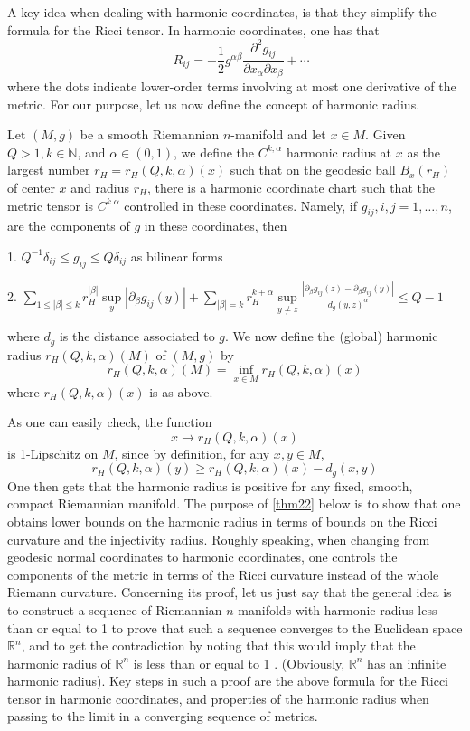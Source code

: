 \documentclass[12pt,hyperref,a4paper,UTF8]{ctexart}
\begin{document}
A key idea when dealing with harmonic coordinates, is that they simplify the formula for the Ricci tensor. In harmonic coordinates, one has that
$$
\quad R_{i j}=-\frac{1}{2} g^{\alpha \beta} \frac{\partial^2 g_{i j}}{\partial x_\alpha \partial x_\beta}+\cdots
$$
where the dots indicate lower-order terms involving at most one derivative of the metric. 
For our purpose, let us now define the concept of harmonic radius.
\begin{Definition}
Let $(M, g)$ be a smooth Riemannian $n$-manifold and let $x \in M$. Given $Q>1, k \in \mathbb{N}$, and $\alpha \in(0,1)$, we define the $C^{k, \alpha}$ harmonic radius at $x$ as the largest number $r_H=r_H(Q, k, \alpha)(x)$ such that on the geodesic ball $B_x\left(r_H\right)$ of center $x$ and radius $r_H$, there is a harmonic coordinate chart such that the metric tensor is $C^{k . \alpha}$ controlled in these coordinates. Namely, if $g_{i j}, i, j=1, \ldots, n$, are the components of $g$ in these coordinates, then

\vskip 3pt
1. $Q^{-1} \delta_{i j} \leq g_{i j} \leq Q \delta_{i j}$ as bilinear forms

\vskip 3pt
2. $\sum\limits_{1 \leq|\beta| \leq k} r_H^{|\beta|} \sup\limits_{y}\left|\partial_\beta g_{i j}(y)\right|+\sum\limits_{|\beta|=k} r_H^{k+\alpha} \sup\limits_{y \neq z} \frac{\left|\partial_\beta g_{i j}(z)-\partial_\beta g_{i j}(y)\right|}{d_g(y, z)^\alpha} \leq Q-1$

\vskip 3pt
\noindent
where $d_g$ is the distance associated to $g$. We now define the (global) harmonic radius $r_H(Q, k, \alpha)(M)$ of $(M, g)$ by
$$
r_H(Q, k, \alpha)(M)=\inf _{x \in M} r_H(Q, k, \alpha)(x)
$$
where $r_H(Q, k, \alpha)(x)$ is as above.
\label{def21}
\end{Definition}
As one can easily check, the function
$$
x \rightarrow r_H(Q, k, \alpha)(x)
$$
is 1-Lipschitz on $M$, since by definition, for any $x, y \in M$,
$$
r_H(Q, k, \alpha)(y) \geq r_H(Q, k, \alpha)(x)-d_g(x, y)
$$
One then gets that the harmonic radius is positive for any fixed, smooth, compact Riemannian manifold. The purpose of \autoref{thm22} below is to show that one obtains lower bounds on the harmonic radius in terms of bounds on the Ricci curvature and the injectivity radius. Roughly speaking, when changing from geodesic normal coordinates to harmonic coordinates, one controls the components of the metric in terms of the Ricci curvature instead of the whole Riemann curvature. 
Concerning its proof, let us just say that the general idea is to construct a sequence of Riemannian $n$-manifolds with harmonic radius less than or equal to 1 to prove that such a sequence converges to the Euclidean space $\mathbb{R}^n$, and to get the contradiction by noting that this would imply that the harmonic radius of $\mathbb{R}^n$ is less than or equal to 1 . (Obviously, $\mathbb{R}^n$ has an infinite harmonic radius). Key steps in such a proof are the above formula for the Ricci tensor
in harmonic coordinates, and properties of the harmonic radius when passing to the limit in a converging sequence of metrics.
\end{document}
